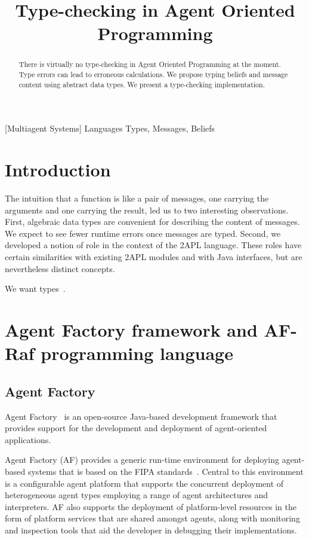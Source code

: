 \documentclass[preprint]{sigplanconf} %
\title{Type-checking in Agent Oriented Programming}
\begin{document}
\maketitle
\begin{abstract} %
There is virtually no type-checking in Agent Oriented Programming at the
moment. Type errors can lead to erroneous calculations. We propose typing
beliefs and message content using abstract data types. We present a type-checking implementation.

\end{abstract} %
[Multiagent Systems]
\terms Languages
\keywords Types, Messages, Beliefs

\section{Introduction} %
The intuition that a function is like a pair of messages, one carrying the
arguments and one carrying the result, led us to two interesting
observations. First, algebraic data types are convenient for describing the
content of messages. We expect to see fewer runtime errors once messages
are typed. Second, we developed a notion of role in the context of the 2APL
language. These roles have certain similarities with existing 2APL modules
and with Java interfaces, but are nevertheless distinct concepts.

We want types~\cite{DBLP:conf/ctcs/Hagino87}.

\section{Agent Factory framework and AF-Raf programming language} %
\subsection{Agent Factory}
Agent Factory~\cite{collier2002agent} is an open-source Java-based
development framework that provides support for the development and
deployment of agent-oriented applications.

Agent Factory (AF) provides a generic run-time environment for deploying
agent-based systems that is based on the FIPA standards~\cite{poslad2000fipa}.
Central to this environment is a configurable agent platform that supports the
concurrent deployment of heterogeneous agent types employing a range of agent
architectures and interpreters. AF also supports the deployment of
platform-level resources in the form of platform services that are shared
amongst agents, along with monitoring and inspection tools that aid the
developer in debugging their implementations. 
\end{document}
